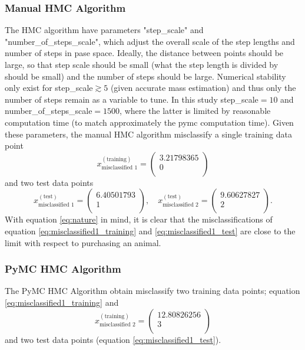 \begin{example}
	\subsubsection{Manual HMC Algorithm}
	\label{sec:manual_hmc_results}
	The HMC algorithm have parameters "step\_scale" and "number\_of\_steps\_scale", which adjust the overall scale of the step lengths and number of steps in pase space. Ideally, the distance between points should be large, so that step scale should be small (what the step length is divided by should be small) and the number of steps should be large. Numerical stability only exist for step\_scale$\gtrsim 5$ (given accurate mass estimation) and thus only the number of steps remain as a variable to tune. In this study step\_scale$=10$ and number\_of\_steps\_scale$=1500$, where the latter is limited by reasonable computation time (to match approximately the pymc computation time). Given these parameters, the manual HMC algorithm misclassify a single training data point
	\begin{equation}
		x^{(\text{training})}_{\text{misclassified 1}} = \begin{pmatrix}
			3.21798365\\ 0\\
		\end{pmatrix}
		\label{eq:misclassified1_training}
	\end{equation}
	and two test data points
	\begin{equation}
		x^{(\text{test})}_{\text{misclassified 1}} = \begin{pmatrix}
			6.40501793\\ 1\\
		\end{pmatrix}, \quad x^{(\text{test})}_{\text{misclassified 2}} = \begin{pmatrix}
			9.60627827\\ 2\\
		\end{pmatrix}.
		\label{eq:misclassified1_test}
	\end{equation}
	With equation \eqref{eq:nature} in mind, it is clear that the misclassifications of equation \eqref{eq:misclassified1_training} and \eqref{eq:misclassified1_test} are close to the limit with respect to purchasing an animal.  
	
	\subsubsection{PyMC HMC Algorithm}
	The PyMC HMC Algorithm obtain misclassify two training data points; equation \eqref{eq:misclassified1_training} and 
	\begin{equation}
		x^{(\text{training})}_{\text{misclassified 2}} = \begin{pmatrix}
			12.80826256\\ 3\\
		\end{pmatrix}
		\label{eq:misclassified1_training2}
	\end{equation}
	and two test data points (equation \eqref{eq:misclassified1_test}).
	

\end{example}
